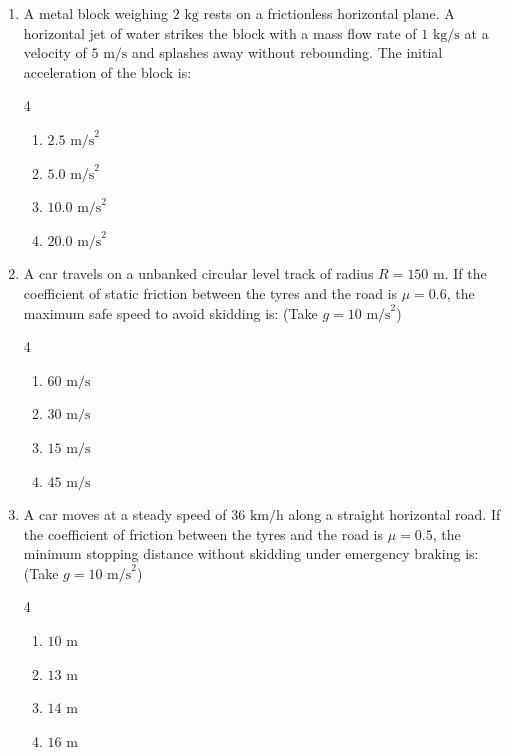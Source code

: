 \documentclass[11pt,a4paper]{article}
\begin{document}
\begin{enumerate}[label=\textbf{\arabic*.},leftmargin=18pt,itemsep=8pt,resume]
  \item A metal block weighing $2\text{ kg}$ rests on a frictionless horizontal plane. A horizontal jet of water strikes the block with a mass flow rate of $1\text{ kg/s}$ at a velocity of $5\text{ m/s}$ and splashes away without rebounding. The initial acceleration of the block is:
  \begin{multicols}{4}
    \begin{enumerate}[label=(\Alph*)]
      \item $2.5\text{ m/s}^2$
      \item $5.0\text{ m/s}^2$
      \item $10.0\text{ m/s}^2$
      \item $20.0\text{ m/s}^2$
    \end{enumerate}
  \end{multicols}

  \item A car travels on a unbanked circular level track of radius $R = 150\text{ m}$. If the coefficient of static friction between the tyres and the road is $\mu = 0.6$, the maximum safe speed to avoid skidding is: (Take $g = 10\text{ m/s}^2$)
  \begin{multicols}{4}
    \begin{enumerate}[label=(\Alph*)]
      \item $60\text{ m/s}$
      \item $30\text{ m/s}$
      \item $15\text{ m/s}$
      \item $45\text{ m/s}$
    \end{enumerate}
  \end{multicols}

  \item A car moves at a steady speed of $36\text{ km/h}$ along a straight horizontal road. If the coefficient of friction between the tyres and the road is $\mu = 0.5$, the minimum stopping distance without skidding under emergency braking is: (Take $g = 10\text{ m/s}^2$)
  \begin{multicols}{4}
    \begin{enumerate}[label=(\Alph*)]
      \item $10\text{ m}$
      \item $13\text{ m}$
      \item $14\text{ m}$
      \item $16\text{ m}$
    \end{enumerate}
  \end{multicols}


\end{enumerate}
\end{document}
